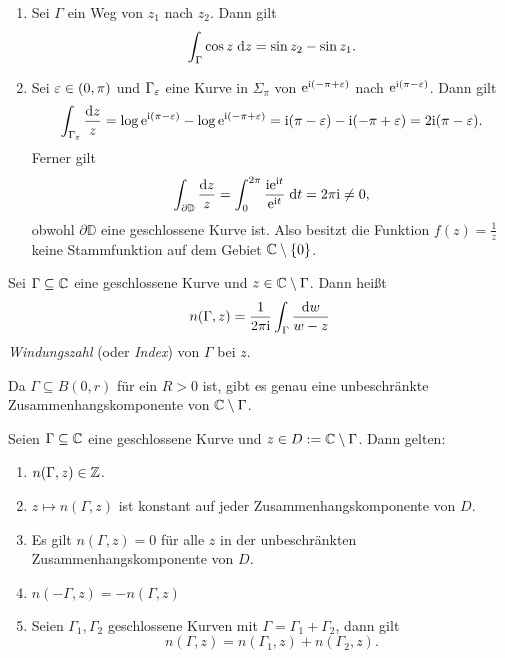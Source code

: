 \documentclass[a4paper,twoside,DIV15,BCOR12mm]{scrbook}
\begin{document}
\begin{bsp} \label{bsp2.14}
  \begin{enumerate}
  \item Sei $\Gamma$ ein Weg von $z_1$ nach $z_2$. Dann gilt
    \[\int_{\Gamma}^{}{\cos{z}}\;\mathrm{d} z = \sin{z_2}-\sin{z_1}.\]
  \item Sei $\varepsilon\in(0,\pi)$ und $\Gamma_\varepsilon$ eine Kurve in $\Sigma_\pi$ von $\mathrm{e}^{\mathrm{i}(-\pi+\varepsilon)}$ nach $\mathrm{e}^{\mathrm{i}(\pi-\varepsilon)}$. Dann
    gilt
    \[\int_{\Gamma_\varepsilon}{\frac{\mathrm{d}z}{z}} = \log{\mathrm{e}^{\mathrm{i}(\pi-\varepsilon)}} - \log{\mathrm{e}^{\mathrm{i}(-\pi+\varepsilon)}} = \mathrm{i}(\pi-\varepsilon) - \mathrm{i}(-\pi+\varepsilon)
    = 2\mathrm{i}(\pi-\varepsilon).\]
    Ferner gilt
    \[\int_{\partial\mathbb{D}}{\frac{\mathrm{d}z}{z}} = \int_{0}^{2\pi}{\frac{\mathrm{i}\mathrm{e}^{\mathrm{i} t}}{\mathrm{e}^{\mathrm{i} t}}}\;\mathrm{d} t = 2\pi\mathrm{i} \neq 0,\]
    obwohl $\partial\mathbb{D}$ eine geschlossene Kurve ist. Also besitzt die Funktion $f(z)=\frac1z$ keine Stammfunktion auf
    dem Gebiet $\mathbb{C}\setminus\{0\}$.
  \end{enumerate}
\end{bsp}

\begin{dfn}
  Sei $\Gamma\subseteq\mathbb{C}$ eine geschlossene Kurve und $z\in\mathbb{C}\setminus\Gamma$. Dann heißt
  \[ n(\Gamma,z) = \frac{1}{2\pi\mathrm{i}} \int_\Gamma{\frac{\mathrm{d}w}{w-z}} \]
  \emph{Windungszahl} (oder \emph{Index}) von $\Gamma$ bei $z$.
\end{dfn}


\begin{bem*} Da $\Gamma \subseteq B(0,r)$ für ein $R>0$ ist, gibt es genau eine unbeschränkte Zusammenhangskomponente von $\mathbb{C}\setminus\Gamma$.
\end{bem*}

\begin{satz}\label{satz2.16}
Seien $\Gamma \subseteq \mathbb{C}$ eine geschlossene Kurve und $z\in D:= \mathbb{C}\setminus\Gamma$. Dann gelten:
\begin{enumerate}
\item $n(\Gamma,z)\in\mathbb{Z}$.
\item $z\mapsto n(\Gamma,z)$ ist konstant auf jeder Zusammenhangskomponente von $D$.
\item Es gilt $n(\Gamma,z) = 0$ für alle $z$ in der unbeschränkten Zusammenhangskomponente von $D$.
\item $n(-\Gamma,z) = -n(\Gamma,z)$
\item Seien $\Gamma_1,\Gamma_2$ geschlossene Kurven mit $\Gamma = \Gamma_1 + \Gamma_2$, dann gilt
\[n(\Gamma,z) = n(\Gamma_1,z)+n(\Gamma_2,z).\]
\end{enumerate}
\end{satz}
\end{document}
